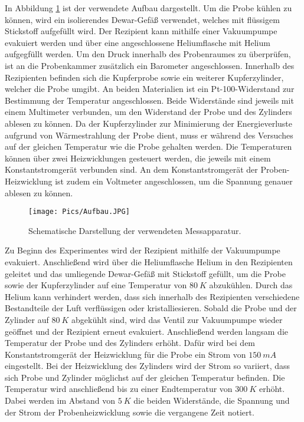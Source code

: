 In Abbildung \ref{fig:Aufbau} ist der verwendete Aufbau dargestellt. Um die Probe
kühlen zu können, wird ein isolierendes Dewar-Gefäß verwendet, welches mit flüssigem
Stickstoff aufgefüllt wird. Der Rezipient kann mithilfe einer Vakuumpumpe evakuiert
werden und über eine angeschlossene Heliumflasche mit Helium aufgegfüllt werden.
Um den Druck innerhalb des Probenraumes zu überprüfen, ist an die Probenkammer
zusätzlich ein Barometer angeschlossen.
Innerhalb des Rezipienten befinden sich die Kupferprobe sowie ein weiterer Kupferzylinder,
welcher die Probe umgibt. An beiden Materialien ist ein Pt-100-Widerstand zur
Bestimmung der Temperatur angeschlossen. Beide Widerstände sind jeweils mit einem
Multimeter verbunden, um den Widerstand der Probe und des Zylinders ablesen zu können.
Da der Kupferzylinder zur Minimierung der
Energieverluste aufgrund von Wärmestrahlung der Probe dient, muss er während des
Versuches auf der gleichen Temperatur wie die Probe gehalten werden. Die Temperaturen
können über zwei Heizwicklungen gesteuert werden, die jeweils mit einem Konstantstromgerät
verbunden sind. An dem Konstantstromgerät der Proben-Heizwicklung ist zudem ein
Voltmeter angeschlossen, um die Spannung genauer ablesen zu können.

\begin{figure}
  \centering
  \texttt{[image: Pics/Aufbau.JPG]}
  \caption{Schematische Darstellung der verwendeten Messapparatur.}
  \label{fig:Aufbau}
\end{figure}

Zu Beginn des Experimentes wird der Rezipient mithilfe der Vakuumpumpe evakuiert.
Anschließend wird über die Heliumflasche Helium in den Rezipienten geleitet und das
umliegende Dewar-Gefäß mit Stickstoff gefüllt, um die Probe sowie der Kupferzylinder
auf eine Temperatur von $\SI{80}{K}$ abzukühlen. Durch das Helium kann verhindert
werden, dass sich innerhalb des Rezipienten verschiedene Bestandteile der Luft
verflüssigen oder kristalliesieren. Sobald die Probe und der Zylinder auf $\SI{80}{K}$
abgekühlt sind, wird das Ventil zur Vakuumpumpe wieder geöffnet und der Rezipient
erneut evakuiert. Anschließend werden langsam die Temperatur der Probe und des
Zylinders erhöht. Dafür wird bei dem Konstantstromgerät der Heizwicklung für die
Probe ein Strom von $\SI{150}{mA}$ eingestellt. Bei der Heizwicklung des Zylinders
wird der Strom so variiert, dass sich Probe und Zylinder möglichst auf der gleichen
Temperatur befinden. Die Temperatur wird anschließend bis zu einer Endtemperatur
von $\SI{300}{K}$ erhöht. Dabei werden im Abstand von $\SI{5}{K}$ die beiden Widerstände,
die Spannung und der Strom der Probenheizwicklung sowie die vergangene Zeit notiert.
